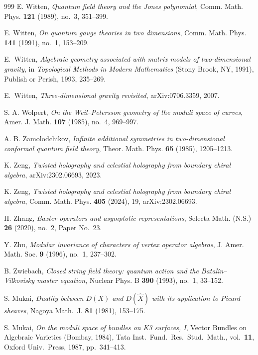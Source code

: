 \begin{thebibliography}{999}
E. Witten, \emph{Quantum field theory and the Jones polynomial}, Comm. Math. Phys. \textbf{121} (1989), no.~3, 351--399.

E. Witten, \emph{On quantum gauge theories in two dimensions}, Comm. Math. Phys. \textbf{141} (1991), no.~1, 153--209.

E.~Witten, \emph{Algebraic geometry associated with matrix models of two-dimensional gravity}, in \emph{Topological Methods in Modern Mathematics} (Stony Brook, NY, 1991), Publish or Perish, 1993, 235--269.

E.~Witten, \emph{Three-dimensional gravity revisited}, arXiv:0706.3359, 2007.

S. A. Wolpert, \emph{On the Weil--Petersson geometry of the moduli space of curves}, Amer. J. Math. \textbf{107} (1985), no.~4, 969--997.

A. B. Zamolodchikov, \emph{Infinite additional symmetries in two-dimensional conformal quantum field theory}, Theor. Math. Phys. \textbf{65} (1985), 1205--1213.

K. Zeng, \emph{Twisted holography and celestial holography from boundary chiral algebra}, arXiv:2302.06693, 2023.

K. Zeng, \emph{Twisted holography and celestial holography from boundary chiral algebra}, Comm. Math. Phys. \textbf{405} (2024), 19, arXiv:2302.06693.

H. Zhang, \emph{Baxter operators and asymptotic representations}, Selecta Math. (N.S.) \textbf{26} (2020), no.~2, Paper No.~23.

Y. Zhu, \emph{Modular invariance of characters of vertex operator algebras}, J. Amer. Math. Soc. \textbf{9} (1996), no.~1, 237--302.

B. Zwiebach, \emph{Closed string field theory: quantum action and the Batalin--Vilkovisky master equation}, Nuclear Phys. B \textbf{390} (1993), no.~1, 33--152.


S. Mukai, \emph{Duality between $D(X)$ and $D(\hat{X})$ with its application to Picard sheaves}, Nagoya Math.~J. \textbf{81} (1981), 153--175.

S. Mukai, \emph{On the moduli space of bundles on K3 surfaces, I}, Vector Bundles on Algebraic Varieties (Bombay, 1984), Tata Inst.\ Fund.\ Res.\ Stud.\ Math., vol.~\textbf{11}, Oxford Univ.\ Press, 1987, pp.~341--413.


\end{thebibliography}
